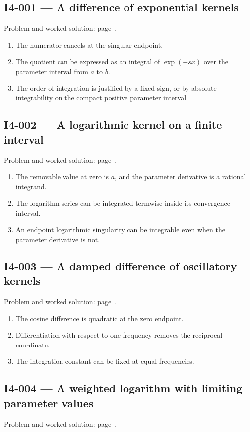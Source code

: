 \documentclass[11pt,oneside,openany]{book}
\begin{document}
\subsection*{I4-001 --- A difference of exponential kernels}
\label{hints:I4-001}
Problem and worked solution: page~\pageref{problem:I4-001}.

\begin{enumerate}
\item The numerator cancels at the singular endpoint.
\item The quotient can be expressed as an integral of \(\exp(-sx)\) over the parameter interval from \(a\) to \(b\).
\item The order of integration is justified by a fixed sign, or by absolute integrability on the compact positive parameter interval.
\end{enumerate}
\subsection*{I4-002 --- A logarithmic kernel on a finite interval}
\label{hints:I4-002}
Problem and worked solution: page~\pageref{problem:I4-002}.

\begin{enumerate}
\item The removable value at zero is \(a\), and the parameter derivative is a rational integrand.
\item The logarithm series can be integrated termwise inside its convergence interval.
\item An endpoint logarithmic singularity can be integrable even when the parameter derivative is not.
\end{enumerate}
\subsection*{I4-003 --- A damped difference of oscillatory kernels}
\label{hints:I4-003}
Problem and worked solution: page~\pageref{problem:I4-003}.

\begin{enumerate}
\item The cosine difference is quadratic at the zero endpoint.
\item Differentiation with respect to one frequency removes the reciprocal coordinate.
\item The integration constant can be fixed at equal frequencies.
\end{enumerate}
\subsection*{I4-004 --- A weighted logarithm with limiting parameter values}
\label{hints:I4-004}
Problem and worked solution: page~\pageref{problem:I4-004}.
\end{document}
